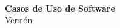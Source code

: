 \begin{center}
  \Huge{\scshape{\textbf{\appname{}}}} \\

  \vspace{16cm}

  \Large{\textbf{Casos de Uso de Software}} \\
  Versión \version{}
\end{center}